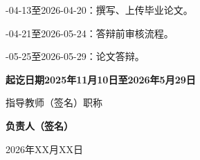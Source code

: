 -04-13至2026-04-20：撰写、上传毕业论文。

-04-21至2026-05-24：答辩前审核流程。

-05-25至2026-05-29：论文答辩。

\vfill
{\bfseries
\noindent 起讫日期\hspace{1em}2025年11月10日至2026年5月29日\vspace{0.5ex}\par
\hfill 指导教师（签名）{\underline{\makebox[7.5em][c]{}}}\hspace{0.5em}职称{\underline{}}\vspace{0.5ex}
}

\par
{}
{\bfseries
\hfill 负责人（签名）{\underline{\makebox[8em][c]{}}}\par
\hfill 2026年XX月XX日
}